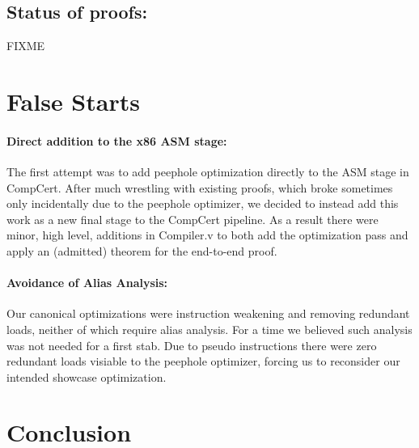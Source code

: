\documentclass{article}
\begin{document}
\subsection{Status of proofs: }
FIXME

\section{False Starts}
\paragraph{Direct addition to the x86 ASM stage: }
The first attempt was to add peephole optimization directly to the ASM
stage in CompCert.  After much wrestling with existing proofs, which
broke sometimes only incidentally due to the peephole optimizer, we
decided to instead add this work as a new final stage to the CompCert
pipeline.  As a result there were minor, high level, additions in
Compiler.v to both add the optimization pass and apply an (admitted)
theorem for the end-to-end proof.

\paragraph{Avoidance of Alias Analysis: }
Our canonical optimizations were instruction weakening and removing
redundant loads, neither of which require alias analysis.  For a time
we believed such analysis was not needed for a first stab.  Due to
pseudo instructions there were zero redundant loads visiable to the
peephole optimizer, forcing us to reconsider our intended showcase
optimization.

\section{Conclusion}
\end{document}
